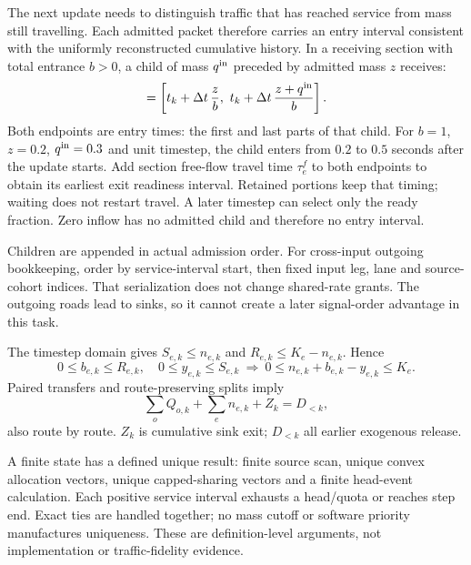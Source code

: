 \documentclass[10pt,a4paper]{article}
\begin{document}
The next update needs to distinguish traffic that has reached service
from mass still travelling. Each admitted packet therefore carries an
entry interval consistent with the uniformly reconstructed cumulative
history. In a receiving section with total entrance $b>0$, a child of
mass $q^{\rm in}$ preceded by admitted mass $z$ receives:
\begin{equation}
 [t^{\rm in}_{\rm front},t^{\rm in}_{\rm tail}]
 =\left[t_k+\Delta t\,\frac z b,\
       t_k+\Delta t\,\frac{z+q^{\rm in}}b\right].
 \label{eq:entry-time}
\end{equation}
Both endpoints are entry times: the first and last parts of that child.
For $b=1$, $z=0.2$, $q^{\rm in}=0.3$ and unit timestep, the child enters
from $0.2$ to $0.5$ seconds after the update starts. Add section free-flow
travel time $\tau^f_e$ to both endpoints to obtain its earliest exit
readiness interval. Retained portions keep that timing; waiting does not
restart travel. A later timestep can select only the ready fraction.
Zero inflow has no admitted child and therefore no entry interval.

Children are appended in actual admission order. For cross-input
outgoing bookkeeping, order by service-interval start, then fixed input
leg, lane and source-cohort indices. That serialization does not change
shared-rate grants. The outgoing roads lead to sinks, so it cannot create
a later signal-order advantage in this task.
\par

The timestep domain gives $S_{e,k}\leq n_{e,k}$ and
$R_{e,k}\leq K_e-n_{e,k}$. Hence
\begin{equation}
 0\leq b_{e,k}\leq R_{e,k},\quad0\leq y_{e,k}\leq S_{e,k}
 \ \Longrightarrow\
 0\leq n_{e,k}+b_{e,k}-y_{e,k}\leq K_e .
 \label{eq:storage-bound}
\end{equation}
Paired transfers and route-preserving splits imply
\begin{equation}
 \sum_oQ_{o,k}+\sum_en_{e,k}+Z_k=D_{<k},
 \label{eq:mass-identity}
\end{equation}
also route by route. $Z_k$ is cumulative sink exit; $D_{<k}$ all earlier
exogenous release.

A finite state has a defined unique result: finite source scan, unique
convex allocation vectors, unique capped-sharing vectors and a finite
head-event calculation. Each positive service interval exhausts a
head/quota or reaches step end. Exact ties are handled together; no
mass cutoff or software priority manufactures uniqueness. These are
definition-level arguments, not implementation or traffic-fidelity evidence.
\end{document}
